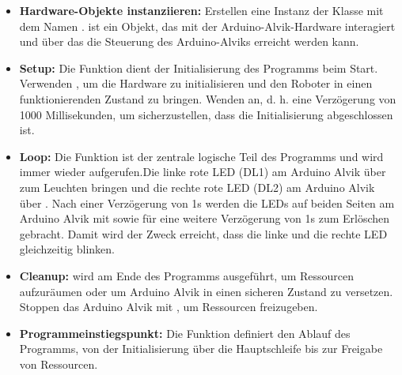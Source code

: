 \begin{enumerate}
\begin{itemize}
		\item \textbf{Hardware-Objekte instanziieren:} Erstellen eine Instanz der Klasse  mit dem Namen .  ist ein Objekt, das mit der Arduino-Alvik-Hardware interagiert und über das die Steuerung des Arduino-Alviks erreicht werden kann.
		\item \textbf{Setup:} Die Funktion  dient der Initialisierung des Programms beim Start. Verwenden , um die Hardware zu initialisieren und den Roboter in einen funktionierenden Zustand zu bringen. Wenden  an, d. h. eine Verzögerung von 1000 Millisekunden, um sicherzustellen, dass die Initialisierung abgeschlossen ist.
		\item \textbf{Loop:} Die Funktion  ist der zentrale logische Teil des Programms und wird immer wieder aufgerufen.Die linke rote LED (DL1) am Arduino Alvik über  zum Leuchten bringen und die rechte rote LED (DL2) am Arduino Alvik über . Nach einer Verzögerung von 1s werden die LEDs auf beiden Seiten am Arduino Alvik mit  sowie  für eine weitere Verzögerung von 1s zum Erlöschen gebracht. Damit wird der Zweck erreicht, dass die linke und die rechte LED gleichzeitig blinken.
		\item \textbf{Cleanup:}  wird am Ende des Programms ausgeführt, um Ressourcen aufzuräumen oder um Arduino Alvik in einen sicheren Zustand zu versetzen. Stoppen das Arduino Alvik mit , um Ressourcen freizugeben.
		\item \textbf{Programmeinstiegspunkt:} Die Funktion  definiert den Ablauf des Programms, von der Initialisierung über die Hauptschleife bis zur Freigabe von Ressourcen.
	\end{itemize}
	

\end{enumerate}
